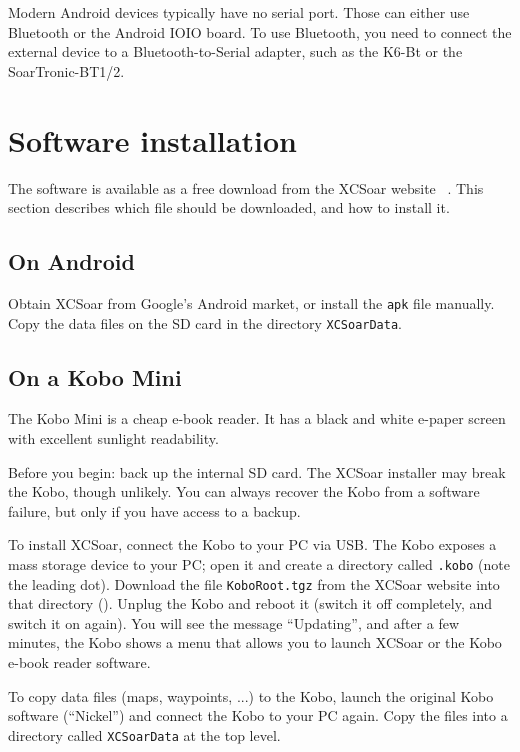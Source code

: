 Modern Android devices typically have no serial port.  Those can either
use Bluetooth or the Android IOIO board.  To use Bluetooth, you need
to connect the external device to a Bluetooth-to-Serial adapter, such
as the K6-Bt or the SoarTronic-BT1/2. %


\section{Software installation}

The software is available as a free download from the XCSoar website
~\xcsoarwebsite{}.  This section describes which file should be
downloaded, and how to install it.

\subsection*{On Android}

Obtain XCSoar from Google's Android market, or install the \verb|apk|
file manually.  Copy the data files on the SD card in the directory
\verb|XCSoarData|.

\subsection*{On a Kobo Mini}

The Kobo Mini is a cheap e-book reader.  It has a black and white
e-paper screen with excellent sunlight readability.

Before you begin: back up the internal SD card.  The XCSoar installer
may break the Kobo, though unlikely.  You can always recover the Kobo
from a software failure, but only if you have access to a backup.

To install XCSoar, connect the Kobo to your PC via USB.  The Kobo
exposes a mass storage device to your PC; open it and create a
directory called \texttt{.kobo} (note the leading dot).  Download the
file \texttt{KoboRoot.tgz} from the XCSoar website into that
directory (). Unplug the Kobo and reboot it (switch it off completely,
and switch it on again).  You will see the message ``Updating'', and
after a few minutes, the Kobo shows a menu that allows you to launch
XCSoar or the Kobo \mbox{e-book} reader software.

To copy data files (maps, waypoints, ...) to the Kobo, launch the
original Kobo software (``Nickel'') and connect the Kobo to your PC
again.  Copy the files into a directory called \texttt{XCSoarData} at
the top level.

